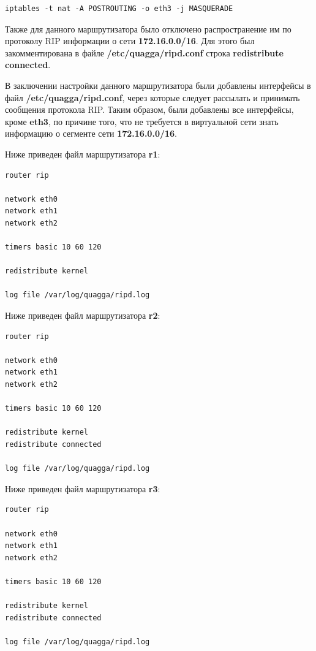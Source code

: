 \documentclass[a4paper,12pt]{article}
\begin{document}
\begin{Verbatim}
iptables -t nat -A POSTROUTING -o eth3 -j MASQUERADE
\end{Verbatim}

Также для данного маршрутизатора было отключено распространение им по протоколу RIP информации о сети \textbf{172.16.0.0/16}. Для этого был закомментирована в файле \textbf{/etc/quagga/ripd.conf} строка \textbf{redistribute connected}.

В заключении настройки данного маршрутизатора были добавлены интерфейсы в файл \textbf{/etc/quagga/ripd.conf}, через которые следует рассылать и принимать сообщения протокола RIP. Таким образом, были добавлены все интерфейсы, кроме \textbf{eth3}, по причине того, что не требуется в виртуальной сети знать информацию о сегменте сети \textbf{172.16.0.0/16}.

Ниже приведен файл  маршрутизатора \textbf{r1}:

\begin{Verbatim}
router rip

network eth0
network eth1
network eth2

timers basic 10 60 120

redistribute kernel

log file /var/log/quagga/ripd.log
\end{Verbatim}

Ниже приведен файл  маршрутизатора \textbf{r2}:

\begin{Verbatim}
router rip

network eth0
network eth1
network eth2

timers basic 10 60 120

redistribute kernel
redistribute connected

log file /var/log/quagga/ripd.log
\end{Verbatim}

Ниже приведен файл  маршрутизатора \textbf{r3}:

\begin{Verbatim}
router rip

network eth0
network eth1
network eth2

timers basic 10 60 120

redistribute kernel
redistribute connected

log file /var/log/quagga/ripd.log
\end{Verbatim}
\end{document}
